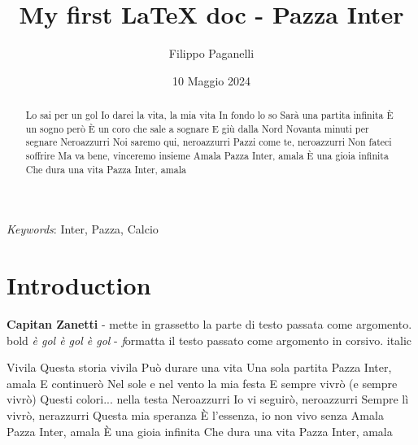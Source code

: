\documentclass[12pt]{article} %
\title{My first LaTeX doc - Pazza Inter}
\author{Filippo Paganelli}
\date{10 Maggio 2024} %
\begin{document}

\maketitle %
\tableofcontents %


\begin{abstract}
   Lo sai per un gol
Io darei la vita, la mia vita
In fondo lo so
Sarà una partita infinita
È un sogno però
È un coro che sale a sognare
E giù dalla Nord
Novanta minuti per segnare
Neroazzurri
Noi saremo qui, neroazzurri
Pazzi come te, neroazzurri
Non fateci soffrire
Ma va bene, vinceremo insieme
Amala
Pazza Inter, amala
È una gioia infinita
Che dura una vita
Pazza Inter, amala
\end{abstract}

\bigskip %

\textit{Keywords}: Inter, Pazza, Calcio %

\section{Introduction} %
\label{sec:intro} %

\textbf{Capitan Zanetti} - \textb mette in grassetto la parte di testo passata come argomento. bold
\textit{è gol è gol è gol} - \textit formatta il testo passato come argomento in corsivo. italic

Vivila Questa storia vivila Può durare una vita
Una sola partita Pazza Inter, amala
E continuerò Nel sole e nel vento la mia festa
E sempre vivrò (e sempre vivrò) Questi colori... nella testa
Neroazzurri Io vi seguirò, neroazzurri
Sempre lì vivrò, nerazzurri Questa mia speranza
È l'essenza, io non vivo senza
Amala Pazza Inter, amala
È una gioia infinita Che dura una vita
Pazza Inter, amala
\cite{Aloisi23} %
\citep{Aloisi23} %
\citet{LaLoggia2024} %
\smallskip
\end{document}
